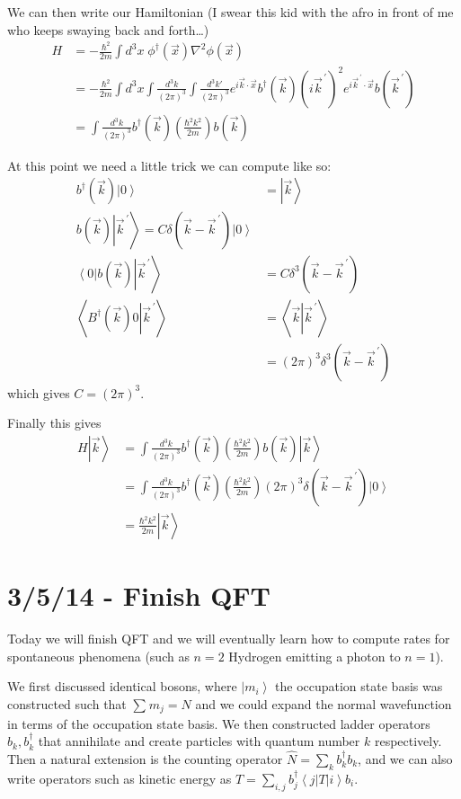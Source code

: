 \documentclass[10pt]{report}
\newcommand{\bra}[1]{\left<#1\right|}
\newcommand{\ket}[1]{\left|#1\right>}
\newcommand{\dotp}[2]{\left<#1\left.\right|#2\right>}
\newcommand{\pvec}[1]{\vec{#1}^{\,\prime}}
\begin{document}
We can then write our Hamiltonian (I swear this kid with the afro in front of me who keeps swaying back and forth\dots)
\begin{align}
    H &= -\frac{\hbar^2}{2m}\int d^3x\; \phi^\dagger(\vec{x}) \nabla ^2\phi(\vec{x})\\
    &= -\frac{\hbar^2}{2m}\int d^3x \int \frac{d^3k}{\left( 2\pi \right)^3}\int \frac{d^3k'}{(2\pi)^3} e^{i\vec{k}\cdot \vec{x}}b^\dagger(\vec{k})(i\pvec{k})^2e^{i\pvec{k}\cdot \vec{x}}b(\pvec{k})\\
    &= \int \frac{d^3k}{(2\pi)^3} b^\dagger(\vec{k})\left( \frac{\hbar^2k^2}{2m} \right)b(\vec{k})
\end{align}

At this point we need a little trick we can compute like so: 
\begin{align}
    b^\dagger(\vec{k})\ket{0} &= \ket{\vec{k}}\\
    b(\vec{k})\ket{\pvec{k}} = C\delta(\vec{k} - \pvec{k})\ket{0}\\
    \bra{0}b(\vec{k})\ket{\pvec{k}} &= C\delta^3(\vec{k} - \pvec{k})\\
    \dotp{B^\dagger(\vec{k})0}{\pvec{k}} &= \dotp{\vec{k}}{\pvec{k}}\\
    &= (2\pi)^3\delta^3(\vec{k} - \pvec{k})
\end{align}
which gives $C = (2\pi)^3$.

Finally this gives
\begin{align}
    H\ket{\vec{k}} &=\int \frac{d^3k}{(2\pi)^3} b^\dagger(\vec{k})\left( \frac{\hbar^2k^2}{2m} \right)b(\vec{k})\ket{\vec{k}}\\
    &=\int \frac{d^3k}{(2\pi)^3} b^\dagger(\vec{k})\left( \frac{\hbar^2k^2}{2m} \right)(2\pi)^3\delta(\vec{k} - \pvec{k})\ket{0}\\
    &= \frac{\hbar^2k^2}{2m}\ket{\vec{k}}
\end{align}
\chapter{3/5/14 - Finish QFT}

Today we will finish QFT and we will eventually learn how to compute rates for spontaneous phenomena (such as $n=2$ Hydrogen emitting a photon to $n=1$).

We first discussed identical bosons, where $\ket{m_i}$ the occupation state basis was constructed such that $\sum_{}^{}m_j = N$ and we could expand the normal wavefunction in terms of the occupation state basis. We then constructed ladder operators $b_k, b_k^\dagger$ that annihilate and create particles with quantum number $k$ respectively. Then a natural extension is the counting operator $\hat{N} = \sum_{k}^{}b_k^\dagger b_k$, and we can also write operators such as kinetic energy as $T = \sum_{i,j}^{}b_j^\dagger\bra{j}T\ket{i}b_i$.
\end{document}
